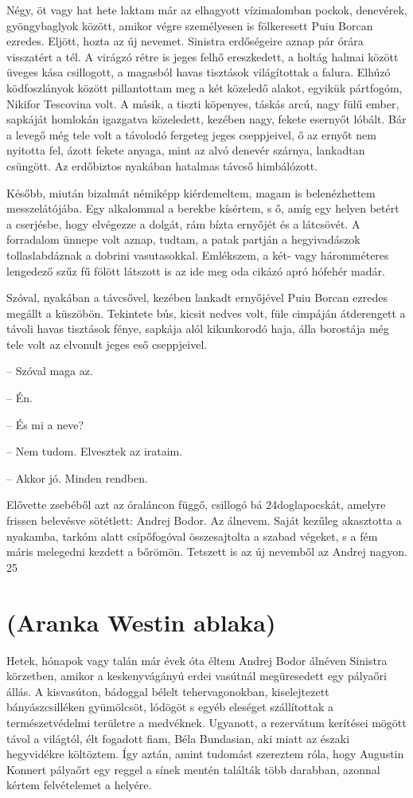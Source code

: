 \documentclass{IEEEtran}
\begin{document}
Négy, öt vagy hat hete laktam már az elhagyott vízimalomban pockok, denevérek,
gyöngybaglyok között, amikor végre személyesen is fölkeresett Puiu Borcan
ezredes. Eljött, hozta az új nevemet. Sinistra erdőségeire aznap pár órára
visszatért a tél. A virágzó rétre is jeges felhő ereszkedett, a holtág halmai
között üveges kása csillogott, a magasból havas tisztások világítottak a
falura. Elhúzó ködfoszlányok között pillantottam meg a két közeledő alakot,
egyikük pártfogóm, Nikifor Tescovina volt. A másik, a tiszti köpenyes, táskás
arcú, nagy fülű ember, sapkáját homlokán igazgatva közeledett, kezében nagy,
fekete esernyőt lóbált. Bár a levegő még tele volt a távolodó fergeteg jeges
cseppjeivel, ő az ernyőt nem nyitotta fel, ázott fekete anyaga, mint az alvó
denevér szárnya, lankadtan csüngött. Az erdőbiztos nyakában hatalmas távcső
himbálózott.

Később, miután bizalmát némiképp kiérdemeltem, magam is belenézhettem
messzelátójába. Egy alkalommal a berekbe kísértem, s ő, amíg egy helyen betért
a cserjésbe, hogy elvégezze a dolgát, rám bízta ernyőjét és a látcsövét. A
forradalom ünnepe volt aznap, tudtam, a patak partján a hegyivadászok
tollaslabdáznak a dobrini vasutasokkal. Emlékszem, a két- vagy háromméteres
lengedező szűz fű fölött látszott is az ide meg oda cikázó apró hófehér madár.

Szóval, nyakában a távcsővel, kezében lankadt ernyőjével Puiu Borcan ezredes
megállt a küszöbön. Tekintete bús, kicsit nedves volt, füle cimpáján
átderengett a távoli havas tisztások fénye, sapkája alól kikunkorodó haja,
álla borostája még tele volt az elvonult jeges eső cseppjeivel.

– Szóval maga az.

– Én.

– És mi a neve?

– Nem tudom. Elvesztek az irataim.

– Akkor jó. Minden rendben.

Elővette zsebéből azt az óraláncon függő, csillogó bá 24doglapocskát, amelyre
frissen belevésve sötétlett: Andrej Bodor. Az álnevem. Saját kezűleg
akasztotta a nyakamba, tarkóm alatt csípőfogóval összesajtolta a szabad
végeket, s a fém máris melegedni kezdett a bőrömön. Tetszett is az új nevemből
az Andrej nagyon.
25
\section{(Aranka Westin ablaka)}

Hetek, hónapok vagy talán már évek óta éltem Andrej Bodor álnéven Sinistra
körzetben, amikor a keskenyvágányú erdei vasútnál megüresedett egy pályaőri
állás. A kisvasúton, bádoggal bélelt tehervagonokban, kiselejtezett
bányászcsilléken gyümölcsöt, lódögöt s egyéb eleséget szállítottak a
természetvédelmi területre a medvéknek. Ugyanott, a rezervátum kerítései
mögött távol a világtól, élt fogadott fiam, Béla Bundasian, aki miatt az
északi hegyvidékre költöztem. Így aztán, amint tudomást szereztem róla, hogy
Augustin Konnert pályaőrt egy reggel a sínek mentén találták több darabban,
azonnal kértem felvételemet a helyére.
\end{document}
